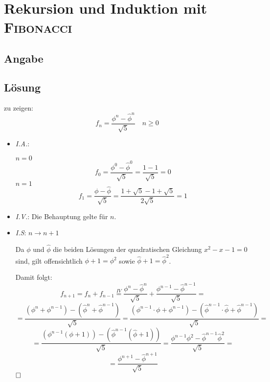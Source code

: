 \section*{Rekursion und Induktion mit \textsc{Fibonacci}}
\subsection*{Angabe}

\subsection*{Lösung}
\begin{flushenum}
\item
  zu zeigen:
  \[ f_n = \frac{\phi^n - \widehat{\phi}^n}{\sqrt{5}} \quad n \geq 0 \]
  \begin{itemize}
    \item \textit{I.A.}:

      $n = 0$
        \[ f_0 = \frac{\phi^0 - \widehat{\phi}^0}{\sqrt{5}} 
               = \frac{1 - 1}{\sqrt{5}} = 0 \]
      $n = 1$
        \[ f_1 = \frac{\phi - \widehat{\phi}}{\sqrt{5}} 
               = \frac{1 + \sqrt{5} - 1 + \sqrt{5}}{2 \sqrt{5}} = 1 \]
    \item \textit{I.V.}: Die Behauptung gelte für $n$.
    \item \textit{I.S}: $n \rightarrow n + 1$

    Da $\phi$ und $\widehat{\phi}$ die beiden Lösungen der quadratischen Gleichung
    $x^2 - x - 1 = 0$ sind, gilt offensichtlich $\phi + 1 = \phi^2$ sowie
    $\widehat{\phi} + 1 = \widehat{\phi}^2$.
    
    Damit folgt:
    \[ f_{n+1} = f_n + f_{n-1} \overset{IV}{=} \frac{\phi^n - \widehat{\phi}^n}{\sqrt{5}} + \frac{\phi^{n-1} - \widehat{\phi}^{n-1}}{\sqrt{5}} = \]
    \[ = \frac{(\phi^n + \phi^{n-1}) - (\widehat{\phi}^n + \widehat{\phi}^{n-1})}{\sqrt{5}}
       = \frac{(\phi^{n-1} \cdot \phi + \phi^{n-1}) - 
         (\widehat{\phi}^{n-1} \cdot \widehat{\phi} + \widehat{\phi}^{n-1})}{\sqrt{5}} = \]
    \[ = \frac{(\phi^{n-1} (\phi + 1)) - (\widehat{\phi}^{n-1} (\widehat{\phi} + 1))}{\sqrt{5}} 
       = \frac{\phi^{n-1} \phi^2 - \widehat{\phi}^{n-1} \widehat{\phi}^2}{\sqrt{5}} = \]
    \[ = \frac{\phi^{n+1} - \widehat{\phi}^{n+1}}{\sqrt{5}} \]
    $\hfill \square$
  \end{itemize}


\end{flushenum}
